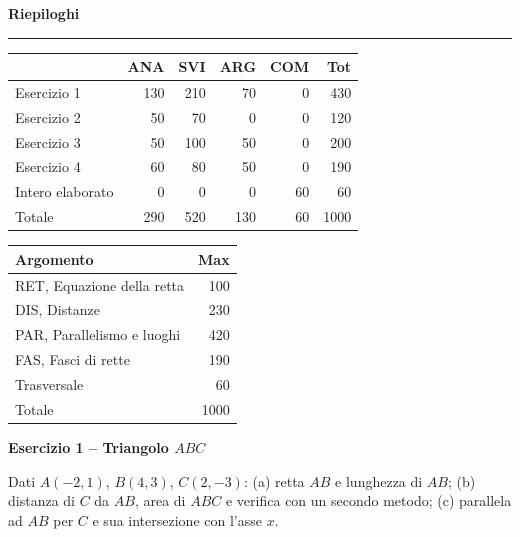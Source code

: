 \documentclass[10pt,a4paper]{article}
\newcommand{\sigla}[1]{\textcolor{\csname colore#1\endcsname}{\textbf{#1}}}
\newcommand{\inizioesercizi}{\clearpage}
\newcommand{\riepiloghi}[2]{\sez{Riepiloghi}
  \noindent\begin{minipage}[t]{0.58\linewidth}#1\end{minipage}\hfill
  \begin{minipage}[t]{0.39\linewidth}#2\end{minipage}\par}
\newcommand{\hANA}{\cellcolor{anabg}\sigla{ANA}}
\newcommand{\hSVI}{\cellcolor{svibg}\sigla{SVI}}
\newcommand{\hARG}{\cellcolor{argbg}\sigla{ARG}}
\newcommand{\hCOM}{\cellcolor{combg}\sigla{COM}}
\newcommand{\sez}[1]{\needspace{4\baselineskip}\par\vspace{1em}%
  {\large\bfseries #1}\par\vspace{-0.4em}\rule{\linewidth}{0.6pt}\par\vspace{0.2em}}
\newcommand{\esercizio}[6]{\needspace{8\baselineskip}\par\vspace{1em}%
  {\large\bfseries #1}\par\vspace{0.25em}}
\begin{document}
\riepiloghi{%
\begin{tabular}{@{}lrrrrr@{}}\toprule
 & \hANA & \hSVI & \hARG & \hCOM & Tot\\\midrule
Esercizio 1 & 130 & 210 & 70 & 0 & 430\\
Esercizio 2 & 50 & 70 & 0 & 0 & 120\\
Esercizio 3 & 50 & 100 & 50 & 0 & 200\\
Esercizio 4 & 60 & 80 & 50 & 0 & 190\\
Intero elaborato & 0 & 0 & 0 & 60 & 60\\\midrule
Totale & 290 & 520 & 130 & 60 & 1000\\\bottomrule
\end{tabular}}{%
\begin{tabular}{@{}lr@{}}\toprule
Argomento & Max\\\midrule
RET, Equazione della retta & 100\\
DIS, Distanze & 230\\
PAR, Parallelismo e luoghi & 420\\
FAS, Fasci di rette & 190\\
Trasversale & 60\\\midrule
Totale & 1000\\\bottomrule
\end{tabular}}

\inizioesercizi
\esercizio{Esercizio 1 -- Triangolo $ABC$}{}{}{}{}{}
\begin{enun}
Dati $A(-2,1)$, $B(4,3)$, $C(2,-3)$: (a) retta $AB$ e lunghezza di $AB$; (b) distanza di $C$ da $AB$, area di $ABC$ e verifica con un secondo metodo; (c) parallela ad $AB$ per $C$ e sua intersezione con l'asse $x$.
\end{enun}
\end{document}
